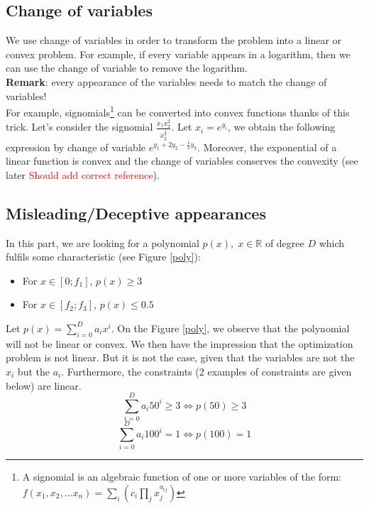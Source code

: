 \subsection{Change of variables}

We use change of variables in order to transform the problem into a linear or convex problem. For example, if every variable appears in a logarithm, then we can use the change of variable to remove the logarithm.\\ 
\textbf{Remark}: every appearance of the variables needs to match the change of variables! \\

For example, signomials\footnote{A signomial is an algebraic function of one or more variables of the form:\\ $f(x_1,x_2,...x_n) = \sum_i{(c_i\prod_j{x_j^{a_{ij}}})}$} can be converted into convex functions thanks of this trick. Let's consider the signomial $\frac{x_1x_2^2}{x_3^{\frac{1}{2}}}$. Let $x_i = e^{y_i}$, we obtain the following expression by change of variable $e^{y_1+2y_2-\frac{1}{2}y_3}$. Moreover, the exponential of a linear function is convex and the change of variables conserves the convexity (see later \textcolor{red}{Should add correct reference}).

\subsection{Misleading/Deceptive appearances}

In this part, we are looking for a polynomial $p(x), \; x \in \mathbb{R}$ of degree $D$ which fulfils some characteristic (see Figure \ref{poly}): 
\begin{itemize}
\item{For $x \in \left[0;f_1\right]$, $p(x) \geq 3$}
\item{For $x \in \left[f_2;f_3\right]$, $p(x) \leq 0.5$} \\
\end{itemize}

Let $p(x) = \sum_{i=0}^{D} a_i x^{i}$.
On the Figure \ref{poly}, we observe that the polynomial will not be linear or convex. We then have the impression that the optimization problem is not linear. But it is not the case, given that the variables are not the $x_i$ but the $a_i$.
Furthermore, the constraints (2 examples of constraints are given below) are linear. 
$$ \sum_{i=0}^{D} a_i 50^{i} \geq 3 \Leftrightarrow p(50) \geq 3$$
$$ \sum_{i=0}^{D} a_i 100^{i} = 1 \Leftrightarrow p(100)=1$$

